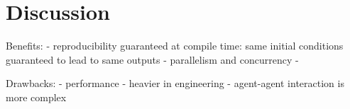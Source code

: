 \section{Discussion}
\label{sec:discussion}

Benefits:
- reproducibility guaranteed at compile time: same initial conditions guaranteed to lead to same outputs
- parallelism and concurrency
- 

Drawbacks:
- performance
- heavier in engineering
- agent-agent interaction is more complex